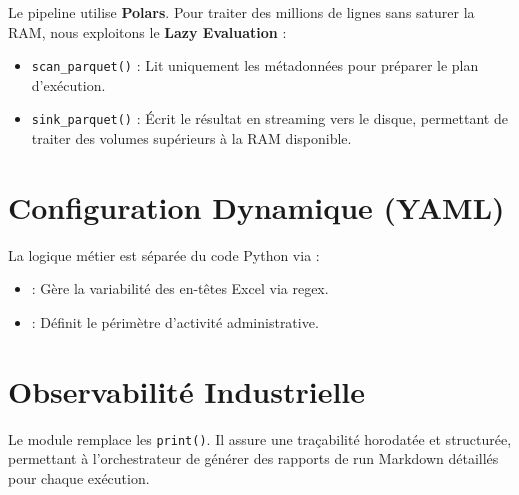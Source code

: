 \documentclass[12pt,a4paper,french]{report}
\begin{document}
Le pipeline utilise \textbf{Polars}. Pour traiter des millions de lignes sans saturer la RAM, nous exploitons le \textbf{Lazy Evaluation} :
\begin{itemize}
    \item \texttt{scan\_parquet()} : Lit uniquement les métadonnées pour préparer le plan d'exécution.
    \item \texttt{sink\_parquet()} : Écrit le résultat en streaming vers le disque, permettant de traiter des volumes supérieurs à la RAM disponible.
\end{itemize}

\section{Configuration Dynamique (YAML)}

La logique métier est séparée du code Python via  :
\begin{itemize}
    \item {} : Gère la variabilité des en-têtes Excel via regex.
    \item {} : Définit le périmètre d'activité administrative.
\end{itemize}

\section{Observabilité Industrielle}

Le module  remplace les \texttt{print()}. Il assure une traçabilité horodatée et structurée, permettant à l'orchestrateur de générer des rapports de run Markdown détaillés pour chaque exécution.
\end{document}
